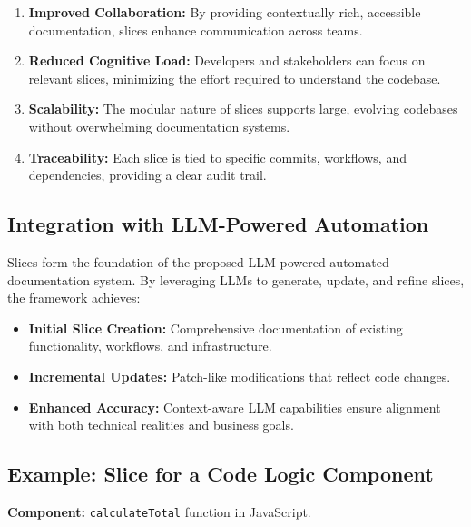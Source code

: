 \documentclass[12pt,oneside]{article}
\begin{document}
\begin{enumerate}
    \item \textbf{Improved Collaboration:} By providing contextually rich, accessible documentation, slices enhance communication across teams.
    \item \textbf{Reduced Cognitive Load:} Developers and stakeholders can focus on relevant slices, minimizing the effort required to understand the codebase.
    \item \textbf{Scalability:} The modular nature of slices supports large, evolving codebases without overwhelming documentation systems.
    \item \textbf{Traceability:} Each slice is tied to specific commits, workflows, and dependencies, providing a clear audit trail.
\end{enumerate}

\subsection{Integration with LLM-Powered Automation}

Slices form the foundation of the proposed LLM-powered automated documentation system. By leveraging LLMs to generate, update, and refine slices, the framework achieves:
\begin{itemize}
    \item \textbf{Initial Slice Creation:} Comprehensive documentation of existing functionality, workflows, and infrastructure.
    \item \textbf{Incremental Updates:} Patch-like modifications that reflect code changes.
    \item \textbf{Enhanced Accuracy:} Context-aware LLM capabilities ensure alignment with both technical realities and business goals.
\end{itemize}

\subsection{Example: Slice for a Code Logic Component}

\noindent\textbf{Component:} \texttt{calculateTotal} function in JavaScript.
\end{document}
